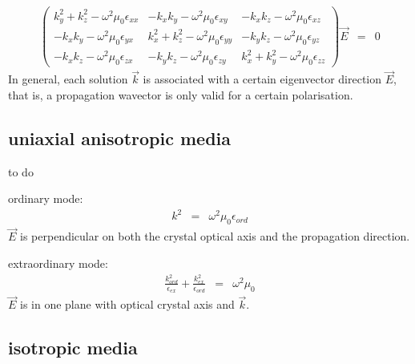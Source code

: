 \documentclass[12pt,a4paper,twoside,openright,BCOR10mm,headsepline,titlepage,abstracton,chapterprefix,final]{scrreprt}
\newcommand\vacuum{0}
\newcommand\wavenumber{k}
\newcommand\Wavevector{\Vector{\wavenumber}}
\newcommand\Vector[1]{\vec{#1}}
\newcommand\scalarEfield{E}
\newcommand\Efield{\Vector{\scalarEfield}}
\newcommand\vacuumpermeability{\mu_{\vacuum}}
\newcommand\scalarpermittivity{\epsilon}
\begin{document}
\begin{eqnarray}
\begin{pmatrix}
 \wavenumber_y^2 + \wavenumber_z^2 - \omega^2 \vacuumpermeability \scalarpermittivity_{xx} 
 &
 - \wavenumber_x \wavenumber_y - \omega^2 \vacuumpermeability \scalarpermittivity_{xy}
 &
 - \wavenumber_x \wavenumber_z - \omega^2 \vacuumpermeability \scalarpermittivity_{xz}
 \\
 - \wavenumber_x \wavenumber_y - \omega^2 \vacuumpermeability \scalarpermittivity_{yx}
 &
 \wavenumber_x^2 + \wavenumber_z^2 - \omega^2 \vacuumpermeability \scalarpermittivity_{yy} 
 &
 - \wavenumber_y \wavenumber_z - \omega^2 \vacuumpermeability \scalarpermittivity_{yz}
 \\
 - \wavenumber_x \wavenumber_z - \omega^2 \vacuumpermeability \scalarpermittivity_{zx}
 &
 - \wavenumber_y \wavenumber_z - \omega^2 \vacuumpermeability \scalarpermittivity_{zy}
 &
 \wavenumber_x^2 + \wavenumber_y^2 - \omega^2 \vacuumpermeability \scalarpermittivity_{zz}  
\end{pmatrix}
\Efield
&=& 0
\end{eqnarray}
In general, each solution $\Wavevector$ is associated with a certain eigenvector direction $\Efield$,
that is, a propagation wavector is only valid for a certain polarisation.

\subsection{uniaxial anisotropic media}
to do

ordinary mode:
\begin{eqnarray}
 \wavenumber^2 &=& \omega^2 \vacuumpermeability \scalarpermittivity_{ord}
\end{eqnarray}
$\Efield$ is perpendicular on both the crystal optical axis and the propagation direction.

extraordinary mode:
\begin{eqnarray}
  \frac{\wavenumber_{ord}^2 }{\scalarpermittivity_{ex} } + \frac{\wavenumber_{ex}^2 }{\scalarpermittivity_{ord} } &=& \omega^2 \vacuumpermeability
\end{eqnarray}
$\Efield$ is in one plane with optical crystal axis and $\Wavevector$.


\subsection{isotropic media}
\end{document}
